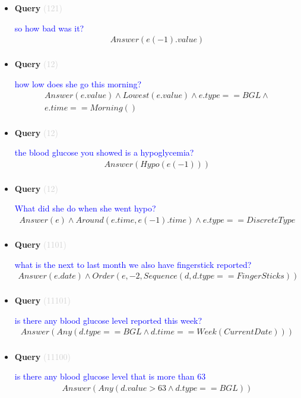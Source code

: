 \documentclass[11pt]{article}
\newcommand{\key}[1]{\textcolor{lightgray}{#1}}
\newcounter{CQuery}
\begin{document}
\begin{itemize}
\item
\textbf{Query\theCQuery} \key{(121)} \addtocounter{CQuery}{1}
\textcolor{blue}{ so how bad was it? }
\begin{multline*}
Answer(e(-1).value) \\ 
\end{multline*}


\item
\textbf{Query\theCQuery} \key{(12)} \addtocounter{CQuery}{1}
\textcolor{blue}{ how low does she go this morning? }
\begin{multline*}
Answer(e.value) \wedge Lowest(e.value) \wedge e.type==BGL \wedge \\ 
e.time==Morning() \\ 
\end{multline*}


\item
\textbf{Query\theCQuery} \key{(12)} \addtocounter{CQuery}{1}
\textcolor{blue}{ the blood glucose you showed is a hypoglycemia? }
\begin{multline*}
Answer(Hypo(e(-1))) \\ 
\end{multline*}


\item
\textbf{Query\theCQuery} \key{(12)} \addtocounter{CQuery}{1}
\textcolor{blue}{ What did she do when she went hypo? }
\begin{multline*}
Answer(e) \wedge Around(e.time, e(-1).time) \wedge e.type==DiscreteType \\ 
\end{multline*}


\item
\textbf{Query\theCQuery} \key{(1101)} \addtocounter{CQuery}{1}
\textcolor{blue}{ what is the next to last month we also have fingerstick reported? }
\begin{multline*}
Answer(e.date) \wedge Order(e, -2, Sequence(d, d.type==FingerSticks)) \\ 
\end{multline*}


\item
\textbf{Query\theCQuery} \key{(11101)} \addtocounter{CQuery}{1}
\textcolor{blue}{ is there any blood glucose level reported this week? }
\begin{multline*}
Answer(Any(d.type==BGL \wedge d.time==Week(CurrentDate))) \\ 
\end{multline*}


\item
\textbf{Query\theCQuery} \key{(11100)} \addtocounter{CQuery}{1}
\textcolor{blue}{ is there any blood glucose level that is more than 63 }
\begin{multline*}
Answer(Any(d.value>63 \wedge d.type==BGL)) \\ 
\end{multline*}



\end{itemize}
\end{document}
